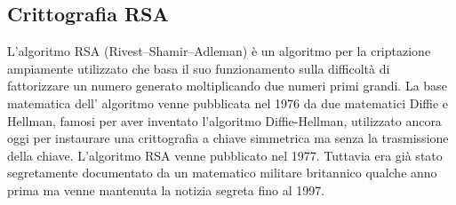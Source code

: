 \begin{itemize}
\chapter{Crittografia RSA}
L'algoritmo RSA (Rivest–Shamir–Adleman) è un algoritmo per la criptazione ampiamente utilizzato che basa il suo funzionamento sulla difficoltà di fattorizzare un numero generato moltiplicando due numeri primi grandi. La base matematica dell' algoritmo venne pubblicata nel 1976 da due matematici Diffie e Hellman, famosi per aver inventato l'algoritmo Diffie-Hellman, utilizzato ancora oggi per instaurare una crittografia a chiave simmetrica ma senza la trasmissione della chiave. L'algoritmo RSA venne pubblicato nel 1977. Tuttavia era già stato segretamente documentato da un matematico  militare britannico qualche anno prima ma venne mantenuta la notizia segreta fino al 1997.
 

\end{itemize}
